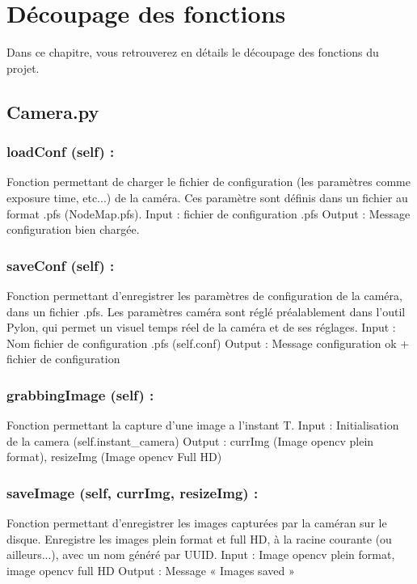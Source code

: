 \chapter{Découpage des fonctions}

Dans ce chapitre, vous retrouverez en détails le découpage des fonctions du projet.

\section{Camera.py}
\subsection{loadConf (self) :}
Fonction permettant de charger le fichier de configuration (les paramètres comme exposure time, etc...) de la caméra. Ces paramètre sont définis dans un fichier au format .pfs (NodeMap.pfs).
Input : fichier de configuration .pfs
Output : Message configuration bien chargée.

\subsection{saveConf (self) :}
Fonction permettant d’enregistrer les paramètres de configuration de la caméra, dans un fichier .pfs. Les paramètres caméra sont réglé préalablement dans l’outil Pylon, qui permet un visuel temps réel de la caméra et de ses réglages.
Input : Nom fichier de configuration .pfs (self.conf)
Output : Message configuration ok + fichier de configuration

\subsection{grabbingImage (self) :}
Fonction permettant la capture d’une image a l’instant T.
Input : Initialisation de la camera (self.instant_camera)
Output : currImg (Image opencv plein format), resizeImg (Image opencv Full HD)

\subsection{saveImage (self, currImg, resizeImg) :}
Fonction permettant d’enregistrer les images capturées par la caméran sur le disque. Enregistre les images plein format et full HD, à la racine courante (ou ailleurs...), avec un nom généré par UUID.
Input : Image opencv plein format, image opencv full HD
Output : Message « Images saved »

